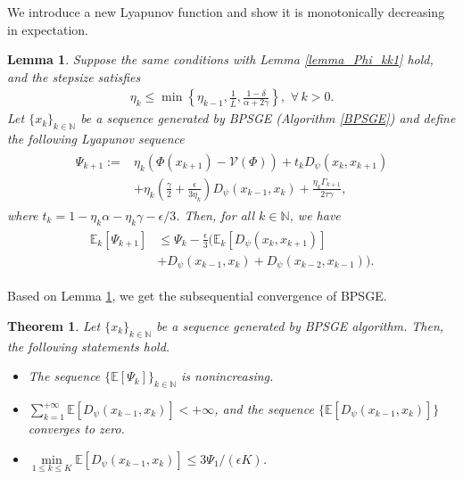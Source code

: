 \documentclass[letterpaper]{article} %
\newtheorem{theorem}{Theorem}
\newtheorem{lemma}{Lemma}
\begin{document}
	We introduce a new  Lyapunov function and show it is monotonically decreasing in expectation. 
	\begin{lemma}\label{lyapunov_descent}
		Suppose the same conditions with Lemma \ref{lemma_Phi_kk1} hold, and  the stepsize satisfies 
		\begin{eqnarray}
			\eta_{k}\le \min\left\{\eta_{k-1}, \frac{1}{\bar{L}}, \frac{1-\delta}{\alpha+2\gamma}\right\}, \,\, \forall\, k>0. \label{stepsize_set}
		\end{eqnarray}
		Let $\{x_{k}\}_{k\in\mathbb{N}}$ be a sequence generated by BPSGE (Algorithm \ref{BPSGE}) and define the following Lyapunov sequence 
		\begin{eqnarray}
			\begin{aligned}
				\Psi_{k+1}:= &\eta_{k}(\Phi(x_{k+1}) -\mathcal{V}(\Phi))  +t_{k}D_{\psi}(x_{k},x_{k+1})\\
				&+\eta_{k}\left(\frac{\gamma}{2}+\frac{\epsilon}{3\eta_{k}}\right)D_{\psi}(x_{k-1},x_{k})+\frac{\eta_{k}\Gamma_{k+1}}{2\tau\gamma}, \label{lyapunov_function}
			\end{aligned}
		\end{eqnarray}
		where $t_{k}=1-\eta_{k}\alpha-\eta_{k}\gamma-\epsilon/3$. Then, for all $k\in\mathbb{N}$, we have
		\begin{eqnarray}
			\begin{aligned} %
				\mathbb{E}_{k}[\Psi_{k+1}]&\le\Psi_{k}-\frac{\epsilon}{3}(\mathbb{E}_{k}[D_{\psi}(x_{k},x_{k+1})]\\
				&+D_{\psi}(x_{k-1},x_{k})+D_{\psi}(x_{k-2},x_{k-1})).
			\end{aligned}\label{decent_inequality_01}
		\end{eqnarray} 
	\end{lemma}
	
	Based on Lemma \ref{lyapunov_descent}, we get the subsequential convergence of BPSGE.
	\begin{theorem}\label{subsequence_convergence}
		Let $\{x_{k}\}_{k\in\mathbb{N}}$ be a sequence generated by BPSGE algorithm. Then, the following statements hold.
		\begin{itemize}
			\item The sequence $\{\mathbb{E}[\Psi_{k}]\}_{k\in\mathbb{N}}$ is nonincreasing.
			\item $\sum\limits_{k=1}^{+\infty}\mathbb{E}[D_{\psi}(x_{k-1},x_{k})]<+\infty$,
			and    the sequence $\{\mathbb{E}[ D_{\psi}(x_{k-1}, x_{k}) ]\}$  %
			converges to zero. 
			\item $\min\limits_{1\le k\le K}\mathbb{E}[D_{\psi}(x_{k-1},x_{k})]\le 3\Psi_{1}/(\epsilon K)$.
		\end{itemize}
	\end{theorem}
	
\end{document}
